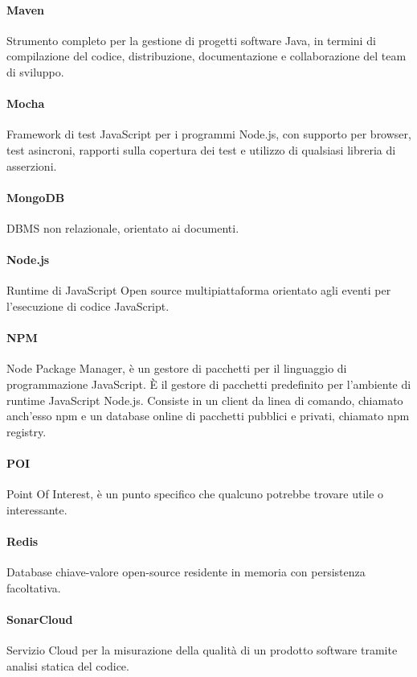 	\paragraph*{Maven}
	Strumento completo per la gestione di progetti software Java, in termini di compilazione del codice, distribuzione, documentazione e collaborazione del team di sviluppo.
	
	\paragraph*{Mocha}
	Framework di test JavaScript per i programmi Node.js, con supporto per browser, test asincroni, rapporti sulla copertura dei test e utilizzo di qualsiasi libreria di asserzioni.
	
	\paragraph*{MongoDB}
	DBMS non relazionale, orientato ai documenti.
	
	\paragraph*{Node.js}
	Runtime di JavaScript Open source multipiattaforma orientato agli eventi per l'esecuzione di codice JavaScript.
	
	\paragraph*{NPM}
	Node Package Manager, è un gestore di pacchetti per il linguaggio di programmazione JavaScript. È il gestore di pacchetti predefinito per l'ambiente di runtime JavaScript Node.js. Consiste in un client da linea di comando, chiamato anch'esso npm e un database online di pacchetti pubblici e privati, chiamato npm registry.
	
	\paragraph*{POI}
	Point Of Interest, è un punto specifico che qualcuno potrebbe trovare utile o interessante.
	
	\paragraph*{Redis}
	Database chiave-valore open-source residente in memoria con persistenza facoltativa.
	
	\paragraph*{SonarCloud}
	Servizio Cloud per la misurazione della qualità di un prodotto software tramite analisi statica del codice.

